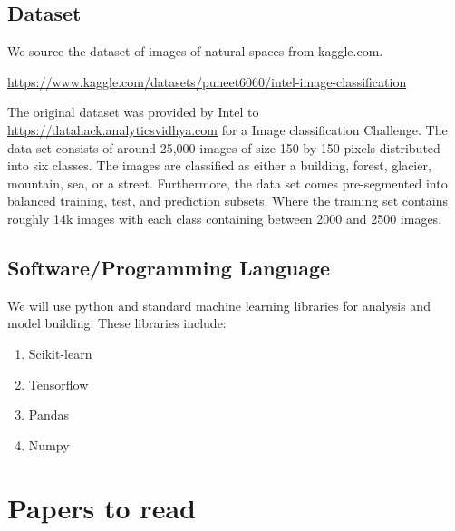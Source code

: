 \documentclass{article}
\begin{document}
\subsection{Dataset}

We source the dataset of images of natural spaces from kaggle.com.
\begin{center}
    \url{https://www.kaggle.com/datasets/puneet6060/intel-image-classification}
\end{center}

The original dataset was provided by Intel to \url{https://datahack.analyticsvidhya.com} for a Image classification Challenge. 
The data set consists of around 25,000 images of size 150 by 150 pixels distributed into six classes.
The images are classified as either a building, forest, glacier, mountain, sea, or a street.
Furthermore, the data set comes pre-segmented into balanced training, test, and prediction subsets. 
Where the training set contains roughly 14k images with each class containing between 2000 and 2500 images.

\subsection{Software/Programming Language}

We will use python and standard machine learning libraries for analysis and model building. These libraries include:

\begin{enumerate}
    \item Scikit-learn \\
    \item Tensorflow \\
    \item Pandas \\
    \item Numpy
\end{enumerate}{}
\section{Papers to read}
\end{document}
